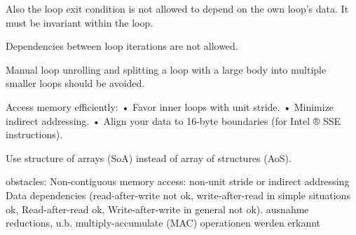 \documentclass[11pt]{article}
\begin{document}
Also the loop exit condition is not allowed to depend on the own loop's data. It must be invariant within the loop.

Dependencies between loop iterations are not allowed.

Manual loop unrolling and splitting a loop with a large body into multiple smaller loops should be avoided.

Access memory efficiently:
• Favor inner loops with unit stride.
• Minimize indirect addressing.
• Align your data to 16-byte boundaries (for Intel ® SSE instructions).

Use structure of arrays (SoA) instead of array of structures (AoS).

obstacles:
Non-contiguous memory access: non-unit stride or indirect addressing
Data dependencies (read-after-write not ok, write-after-read in simple situations ok, Read-after-read ok, Write-after-write in general not ok). ausnahme reductions, u.b. multiply-accumulate (MAC) operationen werden erkannt
\end{document}
